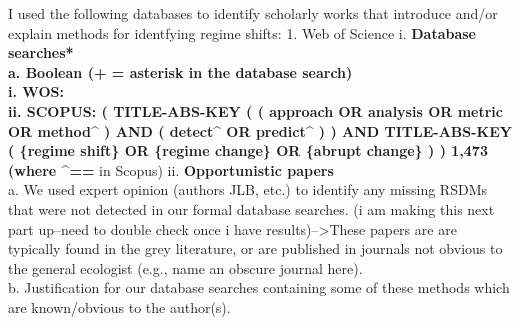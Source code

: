 \documentclass[12pt,twoside]{reedthesis}
\begin{document}
I used the following databases to identify scholarly works that introduce and/or explain methods for identfying regime shifts:
1. Web of Science
i. \textbf{Database searches*\\
a. Boolean (+ = asterisk in the database search)\\
i. WOS:\\
ii. SCOPUS: ( TITLE-ABS-KEY ( ( approach OR analysis OR metric OR method\^{} ) AND ( detect\^{} OR predict\^{} ) ) AND TITLE-ABS-KEY ( \{regime shift\} OR \{regime change\} OR \{abrupt change\} ) ) \textbf{1,473} (where \^{}== } in Scopus)
ii. \textbf{Opportunistic papers}\\
a. We used expert opinion (authors JLB, etc.) to identify any missing RSDMs that were not detected in our formal database searches. (i am making this next part up--need to double check once i have results)--\textgreater{}These papers are are typically found in the grey literature, or are published in journals not obvious to the general ecologist (e.g., name an obscure journal here).\\
b. Justification for our database searches containing some of these methods which are known/obvious to the author(s).
\end{document}
